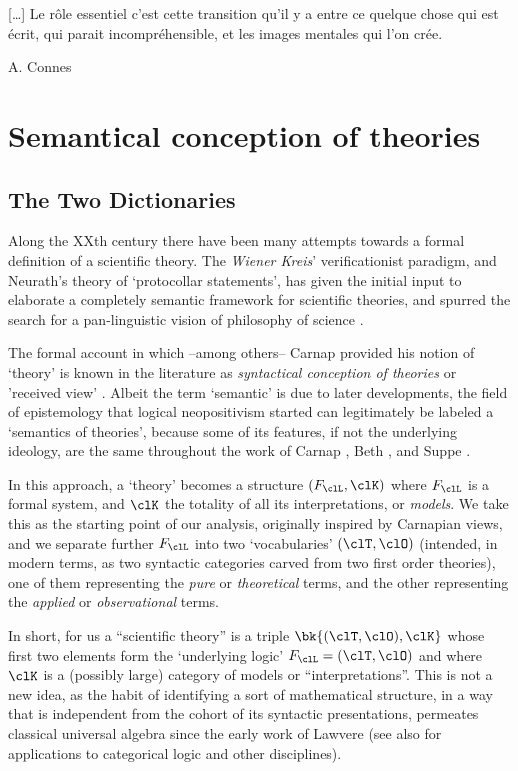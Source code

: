 \epigraph{[\dots\unkern] Le rôle essentiel c'est cette transition qu'il y a entre ce quelque chose qui est écrit, qui parait incompréhensible, et les images mentales qui l'on crée.}{A. Connes}
\section{Semantical conception of theories}
\subsection{The Two Dictionaries}
Along the XXth century there have been many attempts towards a formal definition of a scientific theory. The \emph{Wiener Kreis}' verificationist paradigm, and Neurath's theory of `protocollar statements', has given the initial input to elaborate a completely semantic framework for scientific theories, and spurred the search for a pan-linguistic vision of philosophy of science \cite{Weinb}.

The formal account in which --among others-- Carnap \cite{carnapfound} provided his notion of `theory' is known in the literature as \emph{syntactical conception of theories} or 'received view' \cite{krause-foundation,krause2011axiomatization,giunti2016}. Albeit the term `semantic' is due to later developments, the field of epistemology that logical neopositivism started can legitimately be labeled a `semantics of theories', because some of its features, if not the underlying ideology, are the same throughout the work of Carnap \cite{carnap56,carnapfound},  Beth \cite{?}, and Suppe \cite{suppe89}.

In this approach, a `theory' becomes a structure $(F_\clL, \clK)$ where $F_\clL$ is a formal system, and $\clK$ the totality of all its interpretations, or \emph{models}. We take this as the starting point of our analysis, originally inspired by Carnapian views, and we separate further $F_\clL$ into two `vocabularies' $(\clT,\clO)$ (intended, in modern terms, as two syntactic categories carved from two first order theories), one of them representing the \emph{pure} or \emph{theoretical} terms, and the other representing the \emph{applied} or \emph{observational} terms. 

In short, for us a ``scientific theory'' is a triple $\bk{(\clT,\clO), \clK}$ whose first two elements form the `underlying logic' $F_\clL=(\clT,\clO)$ and where $\clK$ is a (possibly large) category of models or ``interpretations''. This is not a new idea, as the habit of identifying a sort of mathematical structure, in a way that is independent from the cohort of its syntactic presentations, permeates classical universal algebra since the early work of Lawvere \cite{lawvere1963functorial,lawvere1996unity} (see also \cite{abramskyno,Borceux1994,makkai1989accessible} for applications to categorical logic and other disciplines). 

